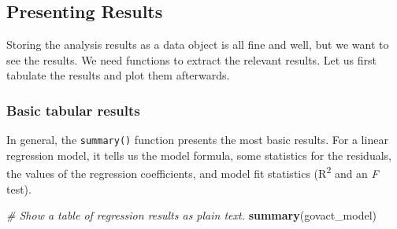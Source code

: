 \documentclass[doc,floatsintext]{apa6}
\newenvironment{Shaded}{\begin{snugshade}}{\end{snugshade}}
\newcommand{\KeywordTok}[1]{\textcolor[rgb]{0.13,0.29,0.53}{\textbf{#1}}}
\newcommand{\CommentTok}[1]{\textcolor[rgb]{0.56,0.35,0.01}{\textit{#1}}}
\newcommand{\NormalTok}[1]{#1}
\begin{document}
\subsection{Presenting Results}\label{presentingresults}

Storing the analysis results as a data object is all fine and well, but
we want to see the results. We need functions to extract the relevant
results. Let us first tabulate the results and plot them afterwards.

\subsubsection{Basic tabular results}\label{basic-tabular-results}

In general, the \texttt{summary()} function presents the most basic
results. For a linear regression model, it tells us the model formula,
some statistics for the residuals, the values of the regression
coefficients, and model fit statistics (R\textsuperscript{2} and an
\emph{F} test).

\begin{Shaded}
\begin{Highlighting}[]
\CommentTok{# Show a table of regression results as plain text.}
\KeywordTok{summary}\NormalTok{(govact_model)}
\end{Highlighting}
\end{Shaded}
\end{document}
